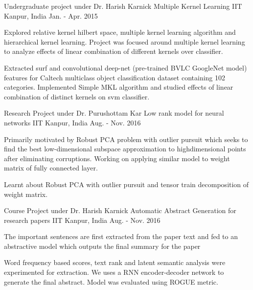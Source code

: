 \begin{cventries}
	
	\cventry
	{Undergraduate project under Dr. Harish Karnick} %
	{Multiple Kernel Learning} %
	{IIT Kanpur, India} %
	{Jan. - Apr. 2015} %
	{
		\begin{cvitems} %
			 \item {Explored relative kernel hilbert space, multiple kernel learning algorithm and hierarchical kernel learning. Project was focused around multiple kernel learning to analyze effects of linear combination of different kernels over classifier.}
			 \item {Extracted surf and convolutional deep-net (pre-trained BVLC GoogleNet model) features for Caltech multiclass object classification dataset containing 102 categories. Implemented Simple MKL algorithm and studied effects of linear combination of distinct kernels on svm classifier.}
		\end{cvitems}
	}
	
	\cventry
	{Research Project under Dr. Purushottam Kar} %
	{Low rank model for neural networks} %
	{IIT Kanpur, India} %
	{Aug. - Nov. 2016} %
	{
		\begin{cvitems} %
			\item { Primarily motivated by Robust PCA problem with outlier pursuit which seeks to find the best low-dimensional subspace approximation to highdimensional points after eliminating corruptions. Working on applying similar model to weight matrix of fully connected layer.}
			\item {Learnt about Robust PCA with outlier pursuit and tensor train decomposition of weight matrix.}
		\end{cvitems}
	}
	
	
	\cventry
	{Course Project under Dr. Harish Karnick} %
	{Automatic Abstract Generation for research papers} %
	{IIT Kanpur, India} %
	{Aug. - Nov. 2016} %
	{
		\begin{cvitems} %
			\item The important sentences are first extracted from the paper text and fed to an abstractive model which outputs the final summary for the paper
			\item Word frequency based scores, text rank and latent semantic analysis were experimented for extraction. We uses a RNN encoder-decoder network to generate the final abstract. Model was evaluated using ROGUE metric.  
		\end{cvitems}
	}
	

\end{cventries}
